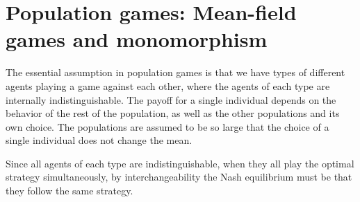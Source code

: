 
\section{Population games: Mean-field games and monomorphism}


The essential assumption in population games is that we have  types of different agents playing a game against each other, where the agents of each type are internally indistinguishable. The payoff for a single individual depends on the behavior of the rest of the population, as well as the other populations and its own choice. The populations are assumed to be so large that the choice of a single individual does not change the mean.

Since all agents of each type are indistinguishable, when they all play the optimal strategy simultaneously, by interchangeability the Nash equilibrium must be that they follow the same strategy.

